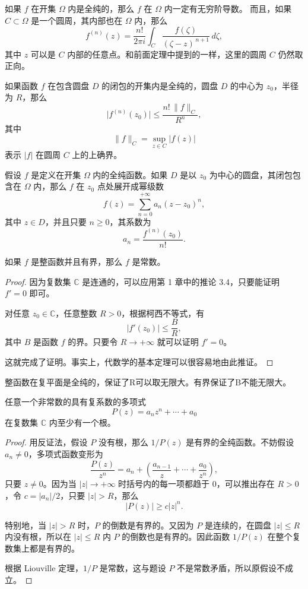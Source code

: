 \documentclass[lang=cn,10pt]{elegantbook}
\begin{document}
\begin{corollary}[推论 4.2柯西积分公式高阶形式]
如果 $f$ 在开集 $\Omega$ 内是全纯的，那么 $f$ 在 $\Omega$ 内一定有无穷阶导数。
而且，如果 $C \subset \Omega$ 是一个圆周，其内部也在 $\Omega$ 内，那么
\[
f^{(n)}(z) = \frac{n!}{2\pi i} \int_{C} \frac{f(\zeta)}{(\zeta - z)^{\,n+1}} \, d\zeta,
\]
其中 $z$ 可以是 $C$ 内部的任意点。和前面定理中提到的一样，这里的圆周 $C$ 仍然取正向。
\end{corollary}

\begin{corollary}[推论 4.3 柯西不等式]
如果函数 $f$ 在包含圆盘 $D$ 的闭包的开集内是全纯的，圆盘 $D$ 的中心为 $z_0$，半径为 $R$，那么
\[
\bigl| f^{(n)}(z_0) \bigr| \leq \frac{n! \, \|f\|_{C}}{R^n},
\]
其中
\[
\|f\|_{C} = \sup_{z \in C} |f(z)|
\]
表示 $|f|$ 在圆周 $C$ 上的上确界。
\end{corollary}
\begin{theorem}[定理 4.4 幂级数的系数]
假设 $f$ 是定义在开集 $\Omega$ 内的全纯函数。如果 $D$ 是以 $z_0$ 为中心的圆盘，其闭包包含在 $\Omega$ 内，那么 $f$ 在 $z_0$ 点处展开成幂级数
\[
f(z) = \sum_{n=0}^{+\infty} a_n (z-z_0)^n,
\]
其中 $z \in D$，并且只要 $n \geq 0$，其系数为
\[
a_n = \frac{f^{(n)}(z_0)}{n!}.
\]
\end{theorem}
\begin{corollary}[推论 4.5 Liouville 定理]
如果 $f$ 是整函数并且有界，那么 $f$ 是常数。
\end{corollary}

\begin{proof}
因为复数集 $\mathbb{C}$ 是连通的，可以应用第 1 章中的推论 3.4，只要能证明 $f' = 0$ 即可。

对任意 $z_0 \in \mathbb{C}$，任意整数 $R > 0$，根据柯西不等式，有
\[
|f'(z_0)| \leq \frac{B}{R},
\]
其中 $B$ 是函数 $f$ 的界。只要令 $R \to +\infty$ 就可以证明 $f' = 0$。

这就完成了证明。事实上，代数学的基本定理可以很容易地由此推证。
\end{proof}
整函数在复平面是全纯的，保证了R可以取无限大。有界保证了B不能无限大。
\begin{corollary}[推论 4.6复系数多项式总有一个根]
任意一个非常数的具有复系数的多项式
\[
P(z) = a_n z^n + \cdots + a_0
\]
在复数集 $\mathbb{C}$ 内至少有一个根。
\end{corollary}
\begin{proof}
用反证法，假设 $P$ 没有根，那么 $1/P(z)$ 是有界的全纯函数。不妨假设 $a_n \neq 0$，多项式函数变形为
\[
\frac{P(z)}{z^n} = a_n + \left( \frac{a_{n-1}}{z} + \cdots + \frac{a_0}{z^n} \right),
\]
只要 $z \neq 0$。因为当 $|z|\to +\infty$ 时括号内的每一项都趋于 $0$，可以推出存在 $R>0$，令 $c = |a_n|/2$，只要 $|z| > R$，那么
\[
|P(z)| \geq c |z|^n.
\]

特别地，当 $|z| > R$ 时，$P$ 的倒数是有界的。又因为 $P$ 是连续的，在圆盘 $|z|\leq R$ 内没有根，所以在 $|z|\leq R$ 内 $P$ 的倒数也是有界的。因此函数 $1/P(z)$ 在整个复数集上都是有界的。

根据 Liouville 定理，$1/P$ 是常数，这与题设 $P$ 不是常数矛盾，所以原假设不成立。
\end{proof}
\end{document}
